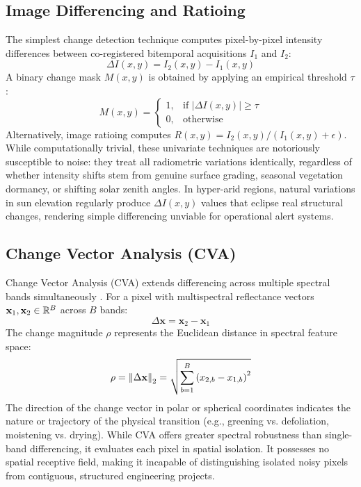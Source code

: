 \subsection{Image Differencing and Ratioing}
The simplest change detection technique computes pixel-by-pixel intensity differences between co-registered bitemporal acquisitions $I_1$ and $I_2$:
\begin{equation}
    \Delta I(x, y) = I_2(x, y) - I_1(x, y)
    \label{eq:image_diff}
\end{equation}
A binary change mask $M(x, y)$ is obtained by applying an empirical threshold $\tau$:
\begin{equation}
    M(x, y) = \begin{cases} 
        1, & \text{if } |\Delta I(x, y)| \ge \tau \\ 
        0, & \text{otherwise} 
    \end{cases}
    \label{eq:threshold_diff}
\end{equation}
Alternatively, image ratioing computes $R(x, y) = I_2(x, y) / (I_1(x, y) + \epsilon)$. While computationally trivial, these univariate techniques are notoriously susceptible to noise: they treat all radiometric variations identically, regardless of whether intensity shifts stem from genuine surface grading, seasonal vegetation dormancy, or shifting solar zenith angles. In hyper-arid regions, natural variations in sun elevation regularly produce $\Delta I(x, y)$ values that eclipse real structural changes, rendering simple differencing unviable for operational alert systems.

\subsection{Change Vector Analysis (CVA)}
Change Vector Analysis (CVA) extends differencing across multiple spectral bands simultaneously \citep{bovolo2007theoretical, zanotta2018continuous}. For a pixel with multispectral reflectance vectors $\mathbf{x}_1, \mathbf{x}_2 \in \mathbb{R}^B$ across $B$ bands:
\begin{equation}
    \Delta \mathbf{x} = \mathbf{x}_2 - \mathbf{x}_1
    \label{eq:cva_vector}
\end{equation}
The change magnitude $\rho$ represents the Euclidean distance in spectral feature space:
\begin{equation}
    \rho = \left\lVert\Delta \mathbf{x}\right\rVert_2 = \sqrt{\sum_{b=1}^B \left(x_{2, b} - x_{1, b}\right)^2}
    \label{eq:cva_magnitude}
\end{equation}
The direction of the change vector in polar or spherical coordinates indicates the nature or trajectory of the physical transition (e.g., greening vs. defoliation, moistening vs. drying). While CVA offers greater spectral robustness than single-band differencing, it evaluates each pixel in spatial isolation. It possesses no spatial receptive field, making it incapable of distinguishing isolated noisy pixels from contiguous, structured engineering projects.

